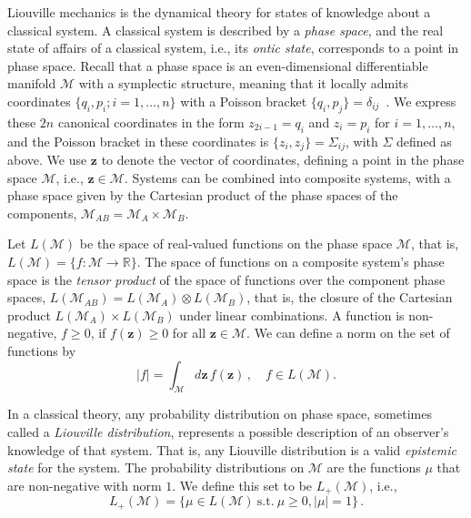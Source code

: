 \documentclass[pra,superscriptaddress,nofootinbib,12pt]{revtex4-2}
\begin{document}
Liouville mechanics is the dynamical theory for states of knowledge about a classical system.  A classical system is described by a \emph{phase space}, and the real state of affairs of a classical system, i.e., its \emph{ontic state}, corresponds to a point in phase space.  Recall that a phase space is an even-dimensional differentiable manifold $\mathcal{M}$ with a symplectic structure, meaning that it locally admits coordinates $\{q_{i},p_{i};i=1,\ldots ,n\}$ with a Poisson bracket $\{q_{i},p_{j}\}=\delta _{ij}$~\cite{Arn97}.  We express these $2n$ canonical coordinates in the form $z_{2i-1} = q_i$ and $z_{i}=p_i$ for $i=1,\ldots,n$, and the Poisson bracket in these coordinates is $\{z_i,z_j\}=\Sigma_{ij}$, with $\Sigma$ defined as above.  We use $\mathbf{z}$ to denote the vector of coordinates, defining a point in the phase space $\mathcal{M}$, i.e., $\mathbf{z} \in \mathcal{M}$.  Systems can be combined into composite systems, with a phase space given by the Cartesian product of the phase spaces of the components, $\mathcal{M}_{AB} = \mathcal{M}_A \times \mathcal{M}_B$.

Let $L(\mathcal{M})$ be the space of real-valued functions on the phase space $\mathcal{M}$, that is, $L(\mathcal{M})=\{f:\mathcal{M}\rightarrow\mathbb{R}\}.$  The space of functions on a composite system's phase space is the \emph{tensor product} of the space of functions over the component phase spaces, $L(\mathcal{M}_{AB})=L(\mathcal{M}_{A})\otimes L(\mathcal{M}_{B})$, that is, the closure of the Cartesian product $L(\mathcal{M}_{A})\times L(\mathcal{M}_{B})$ under linear combinations.
A function is non-negative, $f \geq 0$, if $f(\mathbf{z}) \geq 0$ for all $\mathbf{z} \in \mathcal{M}$.  We can define a norm on the set of functions by
\begin{equation}
  |f|=\int_{\mathcal{M}}d\mathbf{z}\, f(\mathbf{z} )\,, \quad f \in L(\mathcal{M}).
\end{equation}

In a classical theory, any probability distribution on phase space, sometimes called a \emph{Liouville distribution}, represents a possible description of an observer's knowledge of that system.  That is, any Liouville distribution is a valid \emph{epistemic state} for the system.  The probability distributions on $\mathcal{M}$ are the functions $\mu$ that
are non-negative with norm $1$.  We define this set to be $L_+(\mathcal{M})$, i.e.,
\begin{equation}
  L_+(\mathcal{M}) = \{ \mu \in L(\mathcal{M})\ \text{s.t.} \ \mu \geq 0,
  |\mu | =1 \}\,.
\end{equation}
\end{document}
